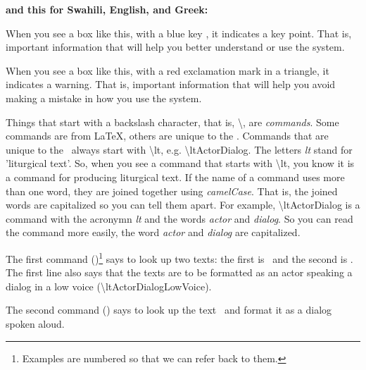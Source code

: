 \documentclass[]{memoir}
\begin{document}

\ltColumnsOn
\textbf{and this for Swahili, English, and Greek:}



\ltColumnsOff
\normalsize
\begin{boxed}
When you see a box like this, with a blue key \color{blue}\faKey{}\color{black}, it indicates a key point.  That is, important information that will help you better understand or use the system.
\end{boxed}
\begin{warning}
When you see a box like this, with a red exclamation mark in a triangle, it indicates a warning.  That is, important information that will help you avoid making a mistake in how you use the system.
\end{warning}
\begin{boxed}
Things that start with a backslash character, that is, \textbackslash, are \emph{commands}. Some commands are from \LaTeX, others are unique to the \ltOcmcSystemAcronymn{}.  Commands that are unique to the \ltOcmcSystemAcronymn{}\ always start with \textbackslash lt, e.g. \textbackslash ltActorDialog. The letters \emph{lt} stand for 'liturgical text'.  So, when you see a command that starts with \textbackslash lt, you know it is a command for producing liturgical text.  If the name of a command uses more than one word, they are joined together using \emph{camelCase}.  That is, the joined words are capitalized so you can tell them apart.  For example, \textbackslash ltActorDialog is a command with the acronymn \emph{lt} and the words \emph{actor} and \emph{dialog}.  So you can read the command more easily, the word \emph{actor} and \emph{dialog} are capitalized.
\end{boxed}
The first command ()\footnote{Examples are numbered so that we can refer back to them.} says to look up two texts: the first is \ and the second is .  The first line also says that the texts are to be formatted as an actor speaking a dialog in a low voice (\textbackslash ltActorDialogLowVoice).

The second command () says to look up the text \ and format it as a dialog spoken aloud.
\end{document}
